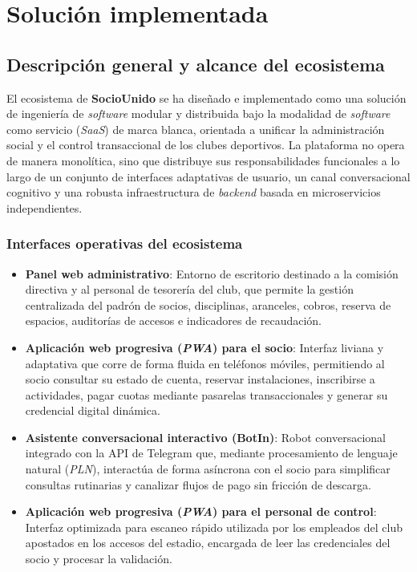\section{Solución implementada}

\setlength{\fboxsep}{0pt}    %
\setlength{\fboxrule}{0.5pt} %

\subsection{Descripción general y alcance del ecosistema}

El ecosistema de \textbf{SocioUnido} se ha diseñado e implementado como una solución de ingeniería de \textit{software} modular y distribuida bajo la modalidad de \textit{software} como servicio (\textit{SaaS}) de marca blanca, orientada a unificar la administración social y el control transaccional de los clubes deportivos. La plataforma no opera de manera monolítica, sino que distribuye sus responsabilidades funcionales a lo largo de un conjunto de interfaces adaptativas de usuario, un canal conversacional cognitivo y una robusta infraestructura de \textit{backend} basada en microservicios independientes.

\subsubsection{Interfaces operativas del ecosistema}

\begin{itemize}
    \item \textbf{Panel web administrativo}: Entorno de escritorio destinado a la comisión directiva y al personal de tesorería del club, que permite la gestión centralizada del padrón de socios, disciplinas, aranceles, cobros, reserva de espacios, auditorías de accesos e indicadores de recaudación.
    \item \textbf{Aplicación web progresiva (\textit{PWA}) para el socio}: Interfaz liviana y adaptativa que corre de forma fluida en teléfonos móviles, permitiendo al socio consultar su estado de cuenta, reservar instalaciones, inscribirse a actividades, pagar cuotas mediante pasarelas transaccionales y generar su credencial digital dinámica.
    \item \textbf{Asistente conversacional interactivo (BotIn)}: Robot conversacional integrado con la API de Telegram que, mediante procesamiento de lenguaje natural (\textit{PLN}), interactúa de forma asíncrona con el socio para simplificar consultas rutinarias y canalizar flujos de pago sin fricción de descarga.
    \item \textbf{Aplicación web progresiva (\textit{PWA}) para el personal de control}: Interfaz optimizada para escaneo rápido utilizada por los empleados del club apostados en los accesos del estadio, encargada de leer las credenciales del socio y procesar la validación.
\end{itemize}

